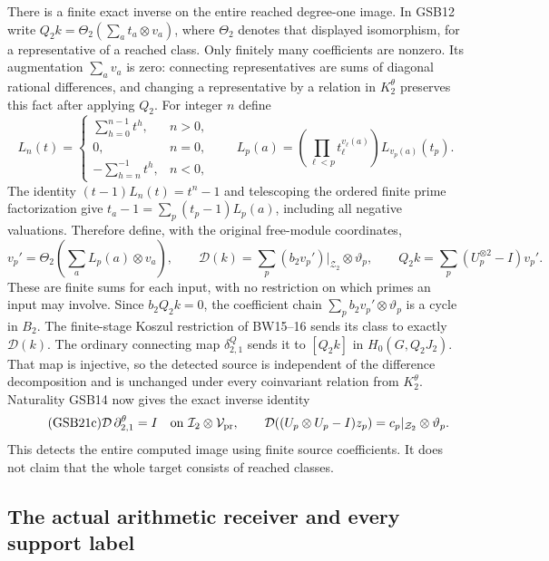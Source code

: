 There is a finite exact inverse on the entire reached degree-one
image. In GSB12 write $Q_2k=\Theta_2(\sum_a t_a\otimes v_a)$,
where $\Theta_2$ denotes that displayed isomorphism, for a
representative of a reached class. Only finitely many coefficients
are nonzero. Its augmentation $\sum_a v_a$ is zero: connecting
representatives are sums of diagonal rational differences, and
changing a representative by a relation in $K_2^\theta$ preserves
this fact after applying $Q_2$. For integer $n$ define
\begin{equation}\tag{GSB21a}
L_n(t)=\begin{cases}
\sum_{h=0}^{n-1}t^h,&n>0,\\
0,&n=0,\\
-\sum_{h=n}^{-1}t^h,&n<0,
\end{cases}\qquad
L_p(a)=\left(\prod_{\ell<p}t_\ell^{v_\ell(a)}\right)
                           L_{v_p(a)}(t_p).
\end{equation}
The identity $(t-1)L_n(t)=t^n-1$ and telescoping the ordered
finite prime factorization give
$t_a-1=\sum_p(t_p-1)L_p(a)$, including all negative valuations.
Therefore define, with the original free-module coordinates,
\begin{equation}\tag{GSB21b}
v_p'=\Theta_2\!\left(\sum_aL_p(a)\otimes v_a\right),\qquad
\mathcal D(k)=\sum_p (b_2v_p')|_{\mathcal Z_2}\otimes\vartheta_p,
\qquad Q_2k=\sum_p(U_p^{\otimes2}-I)v_p'.
\end{equation}
These are finite sums for each input, with no restriction on which
primes an input may involve. Since $b_2Q_2k=0$, the coefficient
chain $\sum_pb_2v_p'\otimes\vartheta_p$ is a cycle in $B_2$.
The finite-stage Koszul restriction of BW15--16 sends its class to
exactly $\mathcal D(k)$. The ordinary connecting map
$\delta^Q_{2,1}$ sends it to $[Q_2k]$ in $H_0(G,Q_2J_2)$.
That map is injective, so the detected source is independent of
the difference decomposition and is unchanged under every
coinvariant relation from $K_2^\theta$. Naturality GSB14 now gives
the exact inverse identity
\begin{equation}\tag{GSB21c}
\mathcal D\,\partial^\theta_{2,1}=I
\quad\text{on }\mathcal I_2\otimes\mathcal V_{\rm pr},\qquad
\mathcal D((U_p\otimes U_p-I)z_p)
                         =c_p|_{\mathcal Z_2}\otimes\vartheta_p.
\end{equation}
This detects the entire computed image using finite source
coefficients. It does not claim that the whole target consists
of reached classes.

\subsection{The actual arithmetic receiver and every support label}


